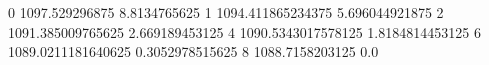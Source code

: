 0 1097.529296875 8.8134765625
1 1094.411865234375 5.696044921875
2 1091.385009765625 2.669189453125
4 1090.5343017578125 1.8184814453125
6 1089.0211181640625 0.3052978515625
8 1088.7158203125 0.0
